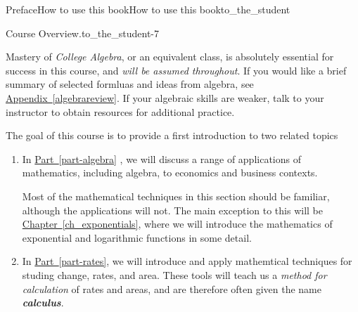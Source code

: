 \documentclass{tufte-book}
\newcommand{\xreffont}{\relax}
\newcommand{\alert}[1]{\textbf{\textit{#1}}}
\numberwithin{equation}{chapter}
\begin{document}
\begin{preface}{Preface}{How to use this book}{}{How to use this book}{}{}{to_the_student}
\begin{paragraphs}{Course Overview.}{to_the_student-7}
\par
Mastery of \emph{College Algebra}, or an equivalent class, is absolutely essential for success in this course, and \emph{will be assumed throughout}. If you would like a brief summary of selected formluas and ideas from algebra, see \hyperref[algebrareview]{Appendix~{\xreffont\ref{algebrareview}}}. If your algebraic skills are weaker, talk to your instructor to obtain resources for additional practice.%
\par
The goal of this course is to provide a first introduction to two related topics%
\begin{enumerate}
\item{}In \hyperref[part-algebra]{Part~{\xreffont\ref{part-algebra}}} , we will discuss a range of applications of mathematics, including algebra, to economics and business contexts.%
\par
Most of the mathematical techniques in this section should be familiar, although the applications will not. The main exception to this will be \hyperref[ch_exponentials]{Chapter~{\xreffont\ref{ch_exponentials}}\textendash{}{\xreffont\ref{ch_logarithms}}}, where we will introduce the mathematics of exponential and logarithmic functions in some detail.%
\item{}In \hyperref[part-rates]{Part~{\xreffont\ref{part-rates}}\textendash{}{\xreffont\ref{part-integrals}}}, we will introduce and apply mathemtical techniques for studing change, rates, and area. These tools will teach us a \emph{method for calculation} of rates and areas, and are therefore often given the name \alert{calculus}.%
\end{enumerate}
%
\end{paragraphs}%
\end{preface}
%
%
\typeout{************************************************}
\typeout{************************************************}
%
\end{document}
